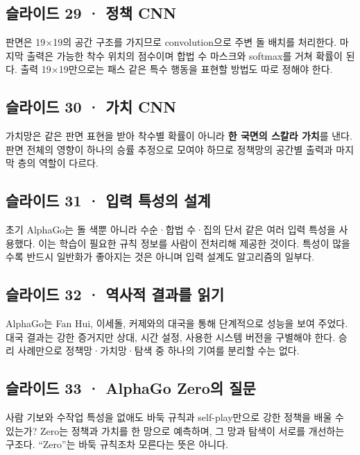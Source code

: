 \documentclass[11pt,a4paper]{article}
\begin{document}
\subsection{슬라이드 29 · 정책 CNN}

판면은 19×19의 공간 구조를 가지므로 convolution으로 주변 돌 배치를 처리한다. 마지막 출력은 가능한 착수 위치의 점수이며 합법 수 마스크와 softmax를 거쳐 확률이 된다. 출력 19×19만으로는 패스 같은 특수 행동을 표현할 방법도 따로 정해야 한다.\par

\subsection{슬라이드 30 · 가치 CNN}

가치망은 같은 판면 표현을 받아 착수별 확률이 아니라 \textbf{한 국면의 스칼라 가치}를 낸다. 판면 전체의 영향이 하나의 승률 추정으로 모여야 하므로 정책망의 공간별 출력과 마지막 층의 역할이 다르다.\par

\subsection{슬라이드 31 · 입력 특성의 설계}

초기 AlphaGo는 돌 색뿐 아니라 수순·합법 수·집의 단서 같은 여러 입력 특성을 사용했다. 이는 학습이 필요한 규칙 정보를 사람이 전처리해 제공한 것이다. 특성이 많을수록 반드시 일반화가 좋아지는 것은 아니며 입력 설계도 알고리즘의 일부다.\par

\subsection{슬라이드 32 · 역사적 결과를 읽기}

AlphaGo는 Fan Hui, 이세돌, 커제와의 대국을 통해 단계적으로 성능을 보여 주었다. 대국 결과는 강한 증거지만 상대, 시간 설정, 사용한 시스템 버전을 구별해야 한다. 승리 사례만으로 정책망·가치망·탐색 중 하나의 기여를 분리할 수는 없다.\par

\subsection{슬라이드 33 · AlphaGo Zero의 질문}

사람 기보와 수작업 특성을 없애도 바둑 규칙과 self-play만으로 강한 정책을 배울 수 있는가? Zero는 정책과 가치를 한 망으로 예측하며, 그 망과 탐색이 서로를 개선하는 구조다. “Zero”는 바둑 규칙조차 모른다는 뜻은 아니다.\par
\end{document}
